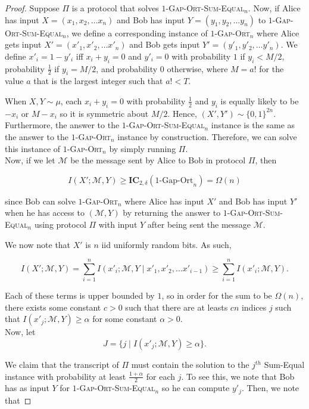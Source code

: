 \documentclass{toc}
\newcommand{\ic}{\ensuremath{\mathbf{IC}}}
\newcommand{\go}{\textsc{Gap-Ort}}
\newcommand{\gose}{\textsc{Gap-Ort-Sum-Equal}}
\begin{document}
\begin{proof}
Suppose $\Pi$ is a protocol that solves $1$-\gose$_n$. Now, if Alice has input $X = (x_1, x_2, \dots x_n)$ and Bob has input $Y = (y_1, y_2, \dots y_n)$ to $1$-\gose$_n$, we define a corresponding instance of $1$-\go$_n$ where Alice gets input $X' = (x'_1, x'_2, \dots x'_n)$ and Bob gets input $Y' = (y'_1, y'_2, \dots y'_n)$. {\color{black}We define $x'_i = 1-y'_i$ iff $x_i+y_i = 0$ and $y'_i = 0$ with probability $1$ if $y_i < M/2$, probability $\frac{1}{2}$ if $y_i=M/2$, and probability $0$ otherwise, where $M = a!$ for the value $a$ that is the largest integer such that $a! < T$.}

When $X,Y \sim \mu$, each $x_i+y_i = 0$ with probability $\frac{1}{2}$ and $y_i$ is equally likely to be $-x_i$ or $M-x_i$ so it is symmetric about $M/2$. Hence, $(X',Y') \sim \{0,1\}^{2n}$. Furthermore, the answer to the $1$-\gose$_n$ instance is the same as the answer to the $1$-\go$_n$ instance by construction. Therefore, we can solve this instance of $1$-\go$_n$ by simply running $\Pi$.\\

Now, if we let $\mathcal{M}$ be the message sent by Alice to Bob in protocol $\Pi$, then

$$I(X' ; \mathcal{M}, Y) \ge \ic_{2,\delta}(1\text{-Gap-Ort}_n) = \Omega(n)$$

since Bob can solve $1$-\go$_n$ where Alice has input $X'$ and Bob has input $Y'$ when he has access to $(\mathcal{M},Y)$ by returning the answer to $1$-\gose$_n$ using protocol $\Pi$ with input $Y$ after being sent the message $\mathcal{M}$.

We now note that $X'$ is $n$ iid uniformly random bits. As such,

$$I(X' ; \mathcal{M}, Y) = \sum_{i=1}^n I(x'_i;\mathcal{M}, Y \mid x'_1, x'_2, \dots x'_{i-1}) \ge \sum_{i=1}^n I(x'_i;\mathcal{M}, Y).$$

Each of these terms is upper bounded by $1$, so in order for the sum to be $\Omega(n)$, there exists some constant $c>0$ such that there are at leasts $cn$ indices $j$ such that $I(x'_j;\mathcal{M}, Y) 
\ge \alpha$ for some constant $\alpha > 0$.\\

Now, let
$$J = \{j \mid I(x'_j;\mathcal{M}, Y) \ge \alpha\}.$$

We claim that the transcript of $\Pi$ must contain the solution to the $j^{th}$ Sum-Equal instance with probability {\color{black}at least $\frac{1+\alpha}{2}$} for each $j$. To see this, we note that Bob has as input $Y$ for $1$-\gose$_n$ so he can compute $y'_j$. Then, we note that


\end{proof}
\end{document}
